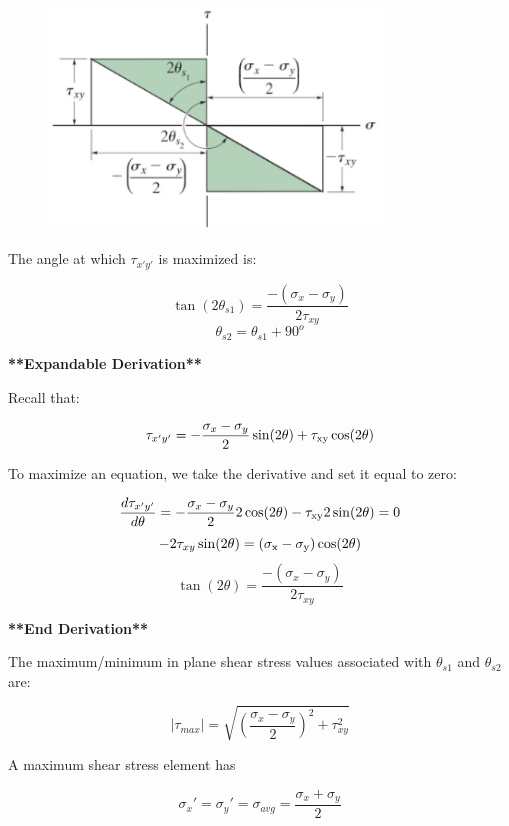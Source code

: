 \begin{figure}[!h]
\centering
\includegraphics[angle=0, width=3.5in]{Stress Transformation-Figures/Max Shear Stresses.png}
\vspace{-2mm}
\caption{\small {}}
\vspace{-3mm}
\label{Fig:MaxShearStress}
\end{figure}

\noindent The angle at which $\tau_{x'y'}$ is maximized is:

\[\tan(2\theta_{s1}) = \frac{-(\sigma_x - \sigma_y)}{2\tau_{xy}}\]
\[\theta_{s2} = \theta_{s1} + 90^o\]

\noindent \textbf{**Expandable Derivation**}

\vspace{5pt}

\noindent Recall that:

\[\tau_{x'y'} = -\frac{\sigma_x - \sigma_y}{2}\rm\sin(2\theta) + \tau_{xy}\cos(2\theta)\]

\noindent To maximize an equation, we take the derivative and set it equal to zero:

\[\frac{d\tau_{x'y'}}{d\theta} = -\frac{\sigma_x - \sigma_y}{2}2\rm\cos(2\theta) - \tau_{xy}2\rm\sin(2\theta) = 0\]
\[-2\tau_{xy}\rm\sin(2\theta)  = (\sigma_x - \sigma_y)\rm\cos(2\theta)\]
\[\tan(2\theta) = \frac{-(\sigma_x - \sigma_y)}{2\tau_{xy}}\]

\noindent \textbf{**End Derivation**}

\noindent The maximum/minimum in plane shear stress values associated with $\theta_{s1}$ and $\theta_{s2}$ are:

\[|\tau_{max}| = \sqrt{(\frac{\sigma_x - \sigma_y}{2})^2 + \tau_{xy}^2}\]

\noindent A maximum shear stress element has

\[\sigma_{x}' = \sigma_{y}' = \sigma_{avg} = \frac{\sigma_x + \sigma_y}{2}\]

